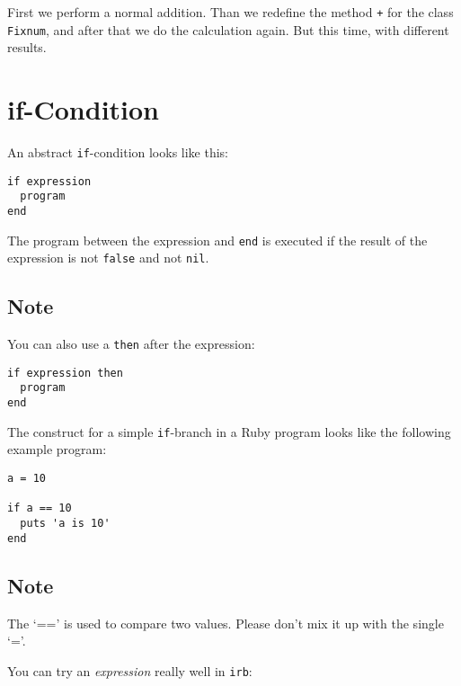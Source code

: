 \documentclass[a4paper]{book}
\begin{document}
First we perform a normal addition. Than we redefine the method \texttt{+} for the class \texttt{Fixnum}, and after that we do the calculation again. But this time, with different results.

\section{if-Condition}\label{if-condition}

An abstract \texttt{if}-condition looks like this:

\begin{shaded}\begin{verbatim}
if expression
  program
end
\end{verbatim}\end{shaded}

The program between the expression and \texttt{end} is executed if the result of the expression is not \texttt{false} and not \texttt{nil}.

\subsection{Note}\label{note-9}

You can also use a \texttt{then} after the expression:

\begin{shaded}\begin{verbatim}
if expression then
  program
end
\end{verbatim}\end{shaded}

The construct for a simple \texttt{if}-branch in a Ruby program looks like the following example program:

\begin{shaded}\begin{verbatim}
a = 10

if a == 10
  puts 'a is 10'
end
\end{verbatim}\end{shaded}

\subsection{Note}\label{note-10}

The `==' is used to compare two values. Please don't mix it up with the single `='.

You can try an \emph{expression} really well in \texttt{irb}:
\end{document}

